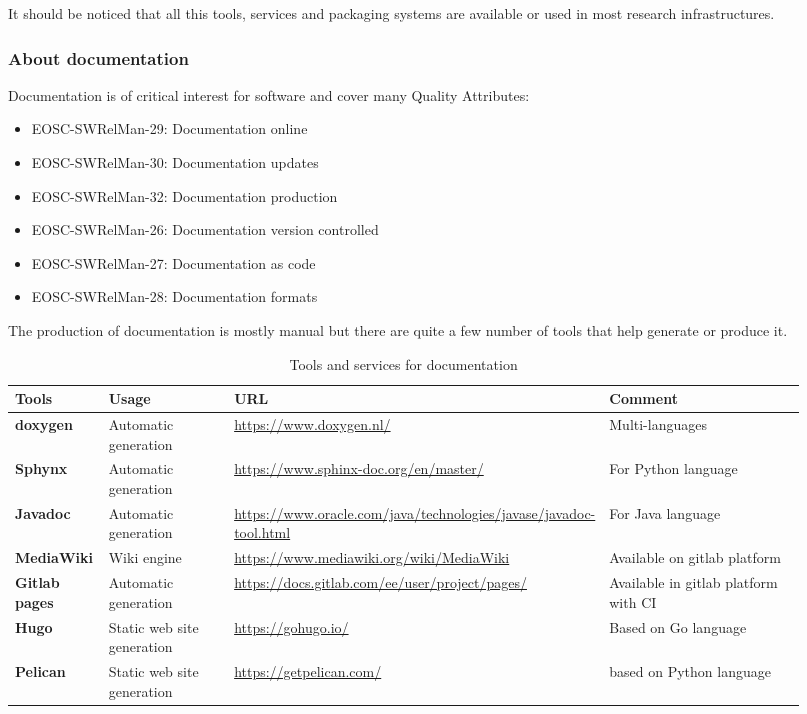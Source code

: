 It should be noticed that all this tools, services and packaging systems are available or used in most research infrastructures.

\subsubsection{About documentation}

Documentation is of critical interest for software and cover many Quality Attributes: 

\begin{itemize}
  \item EOSC-SWRelMan-29: Documentation online
  \item EOSC-SWRelMan-30: Documentation updates
  \item EOSC-SWRelMan-32: Documentation production
  \item EOSC-SWRelMan-26: Documentation version controlled
  \item EOSC-SWRelMan-27: Documentation as code
  \item EOSC-SWRelMan-28: Documentation formats
\end{itemize}

The production of documentation is mostly manual but there are quite a few number of tools that help generate or produce it.

\begin{center}
\begin{table}

  \small
  \begin{tabular}{|p{0.12\linewidth}|p{0.2\linewidth}|p{0.25\linewidth}|p{0.35\linewidth}|} \hline

    \textbf{Tools} & \textbf{Usage} & \textbf{URL} & \textbf{Comment} \\ \hline \hline
    \textbf{doxygen} & Automatic generation & \url{https://www.doxygen.nl/} & Multi-languages \\ \hline
    \textbf{Sphynx} & Automatic generation & \url{https://www.sphinx-doc.org/en/master/} & For Python language \\ \hline
    \textbf{Javadoc} & Automatic generation & \url{https://www.oracle.com/java/technologies/javase/javadoc-tool.html} & For Java language  \\ \hline
    \textbf{MediaWiki} & Wiki engine & \url{https://www.mediawiki.org/wiki/MediaWiki} &  Available on gitlab platform \\ \hline
    \textbf{Gitlab pages} & Automatic generation & \url{https://docs.gitlab.com/ee/user/project/pages/} & Available in gitlab platform with CI  \\ \hline
    \textbf{Hugo} & Static web site generation & \url{https://gohugo.io/} & Based on Go language \\ \hline
    \textbf{Pelican} & Static web site generation & \url{https://getpelican.com/} & based on Python language \\ \hline

  \end{tabular}
  \caption{Tools and services for documentation}
  \label{tab:tools_pack02}
\end{table}
\end{center}

